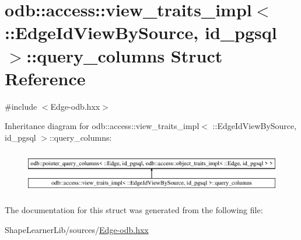 \hypertarget{structodb_1_1access_1_1view__traits__impl_3_01_1_1_edge_id_view_by_source_00_01id__pgsql_01_4_1_1query__columns}{}\section{odb\+:\+:access\+:\+:view\+\_\+traits\+\_\+impl$<$ \+:\+:Edge\+Id\+View\+By\+Source, id\+\_\+pgsql $>$\+:\+:query\+\_\+columns Struct Reference}
\label{structodb_1_1access_1_1view__traits__impl_3_01_1_1_edge_id_view_by_source_00_01id__pgsql_01_4_1_1query__columns}


{\ttfamily \#include $<$Edge-\/odb.\+hxx$>$}

Inheritance diagram for odb\+:\+:access\+:\+:view\+\_\+traits\+\_\+impl$<$ \+:\+:Edge\+Id\+View\+By\+Source, id\+\_\+pgsql $>$\+:\+:query\+\_\+columns\+:\begin{figure}[H]
\begin{center}
\leavevmode
\includegraphics[height=1.914530cm]{da/d44/structodb_1_1access_1_1view__traits__impl_3_01_1_1_edge_id_view_by_source_00_01id__pgsql_01_4_1_1query__columns}
\end{center}
\end{figure}


The documentation for this struct was generated from the following file\+:\begin{DoxyCompactItemize}
\item 
Shape\+Learner\+Lib/sources/\hyperlink{_edge-odb_8hxx}{Edge-\/odb.\+hxx}\end{DoxyCompactItemize}
